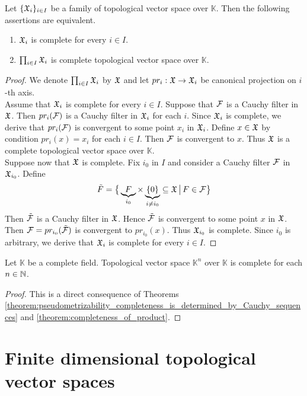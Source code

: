 \begin{theorem}\label{theorem:completeness_of_product}
Let $\{{\mathfrak X}_i\}_{i \in I}$ be a family of topological vector space over $\mathbb{K}$. Then the following assertions are equivalent.
\begin{enumerate}[label=\emph{\textbf{(\roman*)}}, leftmargin=*]
\item ${\mathfrak X}_i$ is complete for every $i \in I$.
\item $\prod_{i \in I}{\mathfrak X}_i$ is complete topological vector space over $\mathbb{K}$.
\end{enumerate}
\end{theorem}
\begin{proof}
We denote $\prod_{i\in I}{\mathfrak X}_i$ by ${\mathfrak X}$ and let $pr_i:{\mathfrak X} \rightarrow {\mathfrak X}_i$ be canonical projection on $i$-th axis.\\
Assume that ${\mathfrak X}_i$ is complete for every $i \in I$. Suppose that ${\mathcal F}$ is a Cauchy filter in ${\mathfrak X}$. Then $pr_i({\mathcal F})$ is a Cauchy filter in ${\mathfrak X}_i$ for each $i$. Since ${\mathfrak X}_i$ is complete, we derive that $pr_i({\mathcal F})$ is convergent to some point $x_i$ in ${\mathfrak X}_i$. Define $x \in {\mathfrak X}$ by condition $pr_i(x) = x_i$ for each $i \in I$. Then ${\mathcal F}$ is convergent to $x$. Thus ${\mathfrak X}$ is a complete topological vector space over $\mathbb{K}$.\\
Suppose now that ${\mathfrak X}$ is complete. Fix $i_0$ in $I$ and consider a Cauchy filter ${\mathcal F}$ in ${\mathfrak X}_{i_0}$. Define
$$\tilde{F} = \big\{\underbrace{F}_{i_0} \times \underbrace{\{0\}}_{i\neq i_0} \subseteq {\mathfrak X}\,\big|\,F\in {\mathcal F}\big\}$$
Then $\tilde{{\mathcal F}}$ is a Cauchy filter in ${\mathfrak X}$. Hence $\tilde{{\mathcal F}}$ is convergent to some point $x$ in ${\mathfrak X}$. Then ${\mathcal F} = pr_{i_0}(\tilde{{\mathcal F}})$ is convergent to $pr_{i_0}(x)$. Thus ${\mathfrak X}_{i_0}$ is complete. Since $i_0$ is arbitrary, we derive that ${\mathfrak X}_i$ is complete for every $i\in I$.
\end{proof}

\begin{corollary}\label{corollary:finite_products_of_copies_of_field_are_complete}
Let $\mathbb{K}$ be a complete field. Topological vector space $\mathbb{K}^n$ over $\mathbb{K}$ is complete for each $n\in {\mathbb N}$.
\end{corollary}
\begin{proof}
This is a direct consequence of Theorems \ref{theorem:pseudometrizability_completeness_is_determined_by_Cauchy_sequences} and \ref{theorem:completeness_of_product}.
\end{proof}

\section{Finite dimensional topological vector spaces}

